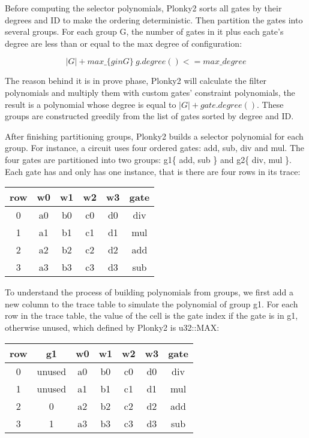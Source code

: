     Before computing the selector polynomials, Plonky2 sorts all gates by their degrees and ID
    to make the ordering deterministic. Then partition the gates into several groups. For each
    group G, the number of gates in it plus each gate's degree are less than or equal to the 
    max degree of configuration:

    $$ |G| + max\_\{g in G\}\ g.degree() <= max\_degree $$
    
    The reason behind it is in prove phase, Plonky2 will calculate the filter polynomials and
    multiply them with custom gates' constraint polynomials, the result is a polynomial whose 
    degree is equal to $|G| + gate.degree()$. These groups are constructed greedily from the 
    list of gates sorted by degree and ID.

    After finishing partitioning groups, Plonky2 builds a selector polynomial for each group. 
    For instance, a circuit uses four ordered gates: add, sub, div and mul. The four gates are
    partitioned into two groups: g1\{ add, sub \} and g2\{ div, mul \}. Each gate has and only has
    one instance, that is there are four rows in its trace:

    \begin{center}
        \begin{tabular}{ |c|c|c|c|c|c| }
            \hline
            row  & w0 & w1 & w2 & w3 & gate \\
            \hline
            0  & a0 & b0 & c0 & d0 & div \\
            \hline
            1  & a1 & b1 & c1 & d1 & mul \\
            \hline
            2  & a2 & b2 & c2 & d2 & add \\
            \hline
            3  & a3 & b3 & c3 & d3 & sub \\
            \hline
        \end{tabular}
    \end{center}

    To understand the process of building polynomials from groups, we first add a new column to the
    trace table to simulate the polynomial of group g1. For each row in the trace table, the value of the cell is
    the gate index if the gate is in g1, otherwise unused, which defined by Plonky2 is u32::MAX:

    \begin{center}
        \begin{tabular}{ |c|c|c|c|c|c|c| }
            \hline
            row & g1 & w0 & w1 & w2 & w3 & gate \\
            \hline
            0 & unused & a0 & b0 & c0 & d0 & div \\
            \hline
            1 & unused & a1 & b1 & c1 & d1 & mul \\
            \hline
            2 & 0 & a2 & b2 & c2 & d2 & add \\
            \hline
            3 & 1 & a3 & b3 & c3 & d3 & sub \\
            \hline
        \end{tabular}
    \end{center}

